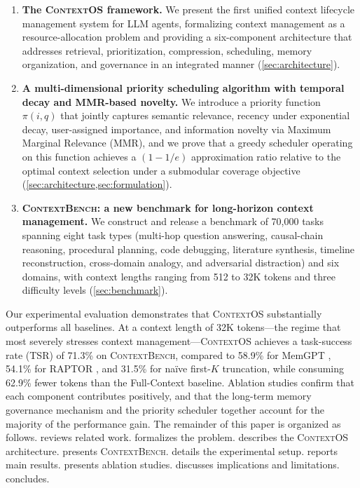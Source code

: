 \documentclass[review,12pt]{elsarticle}
\newcommand{\contextos}{\textsc{ContextOS}}
\newcommand{\contextbench}{\textsc{ContextBench}}
\newcommand{\prio}{\pi}
\begin{document}
\begin{enumerate}[label=(\arabic*), leftmargin=2em]

  \item \textbf{The \contextos{} framework.}  We present the first unified
  context lifecycle management system for LLM agents, formalizing context
  management as a resource-allocation problem and providing a six-component
  architecture that addresses retrieval, prioritization, compression, scheduling,
  memory organization, and governance in an integrated manner
  (\cref{sec:architecture}).

  \item \textbf{A multi-dimensional priority scheduling algorithm with temporal
  decay and MMR-based novelty.}  We introduce a priority function $\prio(i, q)$
  that jointly captures semantic relevance, recency under exponential decay,
  user-assigned importance, and information novelty via Maximum Marginal
  Relevance (MMR), and we prove that a greedy scheduler operating on this
  function achieves a $(1 - 1/e)$ approximation ratio relative to the optimal
  context selection under a submodular coverage objective
  (\cref{sec:architecture,sec:formulation}).

  \item \textbf{\contextbench{}: a new benchmark for long-horizon context
  management.}  We construct and release a benchmark of 70,000 tasks spanning
  eight task types (multi-hop question answering, causal-chain reasoning,
  procedural planning, code debugging, literature synthesis, timeline
  reconstruction, cross-domain analogy, and adversarial distraction) and six
  domains, with context lengths ranging from 512 to 32K tokens and three
  difficulty levels (\cref{sec:benchmark}).

\end{enumerate}

Our experimental evaluation demonstrates that \contextos{} substantially
outperforms all baselines.  At a context length of 32K tokens—the regime that
most severely stresses context management—\contextos{} achieves a task-success
rate (TSR) of 71.3\% on \contextbench{}, compared to 58.9\% for MemGPT
\citep{packer2023memgpt}, 54.1\% for RAPTOR \citep{sarthi2024raptor}, and
31.5\% for na\"{i}ve first-$K$ truncation, while consuming 62.9\% fewer tokens
than the Full-Context baseline.  Ablation studies confirm that each component
contributes positively, and that the long-term memory governance mechanism and
the priority scheduler together account for the majority of the performance
gain.  The remainder of this paper is organized as follows.
 reviews related work.   formalizes the
problem.   describes the \contextos{} architecture.
 presents \contextbench{}.   details the
experimental setup.   reports main results.
 presents ablation studies.   discusses
implications and limitations.   concludes.
\end{document}
